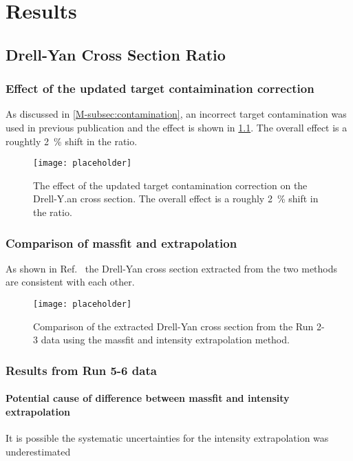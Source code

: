 \documentclass[../main.tex]{subfiles}
\begin{document}
\ifSubfilesClassLoaded{
	\mainmatter
	\setcounter{chapter}{5}
}{}

\chapter{Results}
\label{ch:result}
\section{Drell-Yan Cross Section Ratio}
\subsection{Effect of the updated target contaimination correction}
As discussed in \cref{M-subsec:contamination}, an incorrect target contamination was used
in previous publication and the effect is shown in \cref{fig:contaimination_CSR}.
The overall effect is a roughtly \SI{2}{\percent} shift in the ratio.
\begin{figure}[h!]
	\centering
	\texttt{[image: placeholder]}
	\caption{The effect of the updated target contamination correction on the Drell-Y.an
		cross section. The overall effect is a roughly \SI{2}{\percent} shift in the ratio. }
	\label{fig:contaimination_CSR}
\end{figure}

\subsection{Comparison of massfit and extrapolation}
As shown in Ref.~\cite{dove2023} the Drell-Yan cross section extracted from the two methods
are consistent with each other.
\begin{figure}[h!]
	\centering
	\texttt{[image: placeholder]}
	\caption{Comparison of the extracted Drell-Yan cross section from the Run 2-3 data using the massfit
		and intensity extrapolation method.}
	\label{fig:CSR_Run2-3}
\end{figure}

\subsection{Results from Run 5-6 data}
\subsubsection{Potential cause of difference between massfit and intensity extrapolation}
It is possible the systematic uncertainties for the intensity extrapolation was
underestimated
\end{document}
